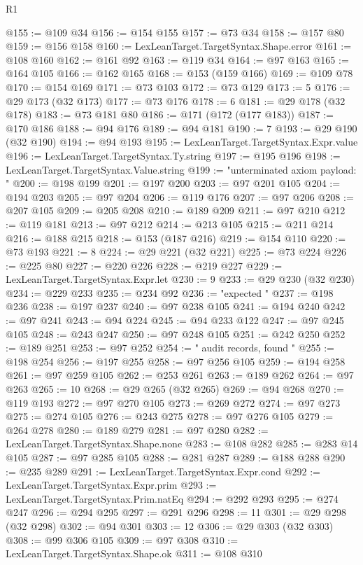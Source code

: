 \begin{lexlean}{R1}
\begin{coremodule}
{{{{{{{{{{{{{{{{{{{{{{{{{{{{{{{{{{{{{{{{{{{{{{{{{{{{{{{{{{{{{{{{{{{{{{{{{{{{{{{{{{{{{{{{{{{{{{{{{{{{{{{{{{{{{{{{{{{{{{{{{{{{{{{{{{{{{{{{{{{{{{{{{{{{{{{{{{{{{{{{{{{{{{{{{{{{{{{{{{{{{{{{{{@155 := @109 @34
@156 := @154 @155
@157 := @73 @34
@158 := @157 @80
@159 := @156 @158
@160 := LexLeanTarget.TargetSyntax.Shape.error
@161 := @108 @160
@162 := @161 @92
@163 := @119 @34
@164 := @97 @163
@165 := @164 @105
@166 := @162 @165
@168 := @153 (@159 @166)
@169 := @109 @78
@170 := @154 @169
@171 := @73 @103
@172 := @73 @129
@173 := 5
@176 := @29 @173 (@32 @173)
@177 := @73 @176
@178 := 6
@181 := @29 @178 (@32 @178)
@183 := @73 @181 @80
@186 := @171 (@172 (@177 @183))
@187 := @170 @186
@188 := @94 @176
@189 := @94 @181
@190 := 7
@193 := @29 @190 (@32 @190)
@194 := @94 @193
@195 := LexLeanTarget.TargetSyntax.Expr.value
@196 := LexLeanTarget.TargetSyntax.Ty.string
@197 := @195 @196
@198 := LexLeanTarget.TargetSyntax.Value.string
@199 := "unterminated axiom payload: "
@200 := @198 @199
@201 := @197 @200
@203 := @97 @201 @105
@204 := @194 @203
@205 := @97 @204
@206 := @119 @176
@207 := @97 @206
@208 := @207 @105
@209 := @205 @208
@210 := @189 @209
@211 := @97 @210
@212 := @119 @181
@213 := @97 @212
@214 := @213 @105
@215 := @211 @214
@216 := @188 @215
@218 := @153 (@187 @216)
@219 := @154 @110
@220 := @73 @193
@221 := 8
@224 := @29 @221 (@32 @221)
@225 := @73 @224
@226 := @225 @80
@227 := @220 @226
@228 := @219 @227
@229 := LexLeanTarget.TargetSyntax.Expr.let
@230 := 9
@233 := @29 @230 (@32 @230)
@234 := @229 @233
@235 := @234 @92
@236 := "expected "
@237 := @198 @236
@238 := @197 @237
@240 := @97 @238 @105
@241 := @194 @240
@242 := @97 @241
@243 := @94 @224
@245 := @94 @233 @122
@247 := @97 @245 @105
@248 := @243 @247
@250 := @97 @248 @105
@251 := @242 @250
@252 := @189 @251
@253 := @97 @252
@254 := " audit records, found "
@255 := @198 @254
@256 := @197 @255
@258 := @97 @256 @105
@259 := @194 @258
@261 := @97 @259 @105
@262 := @253 @261
@263 := @189 @262
@264 := @97 @263
@265 := 10
@268 := @29 @265 (@32 @265)
@269 := @94 @268
@270 := @119 @193
@272 := @97 @270 @105
@273 := @269 @272
@274 := @97 @273
@275 := @274 @105
@276 := @243 @275
@278 := @97 @276 @105
@279 := @264 @278
@280 := @189 @279
@281 := @97 @280
@282 := LexLeanTarget.TargetSyntax.Shape.none
@283 := @108 @282
@285 := @283 @14 @105
@287 := @97 @285 @105
@288 := @281 @287
@289 := @188 @288
@290 := @235 @289
@291 := LexLeanTarget.TargetSyntax.Expr.cond
@292 := LexLeanTarget.TargetSyntax.Expr.prim
@293 := LexLeanTarget.TargetSyntax.Prim.natEq
@294 := @292 @293
@295 := @274 @247
@296 := @294 @295
@297 := @291 @296
@298 := 11
@301 := @29 @298 (@32 @298)
@302 := @94 @301
@303 := 12
@306 := @29 @303 (@32 @303)
@308 := @99 @306 @105
@309 := @97 @308
@310 := LexLeanTarget.TargetSyntax.Shape.ok
@311 := @108 @310
}}}}}}}}}}}}}}}}}}}}}}}}}}}}}}}}}}}}}}}}}}}}}}}}}}}}}}}}}}}}}}}}}}}}}}}}}}}}}}}}}}}}}}}}}}}}}}}}}}}}}}}}}}}}}}}}}}}}}}}}}}}}}}}}}}}}}}}}}}}}}}}}}}}}}}}}}}}}}}}}}}}}}}}}}}}}}}}}}}}}}}}}}}
\end{coremodule}
\end{lexlean}
